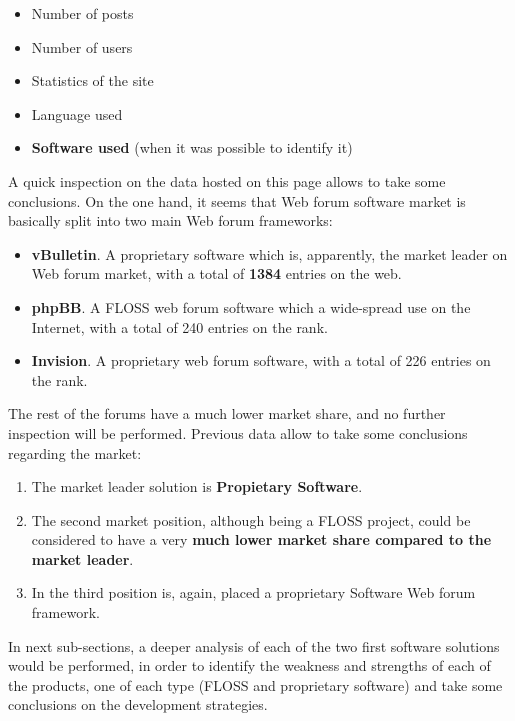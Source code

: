 \documentclass[11pt]{article}
\begin{document}
\begin{itemize}\itemsep0pt
\item{Number of posts}
\item{Number of users}
\item{Statistics of the site}
\item{Language used}
\item{\textbf{Software used} (when it was possible to identify it)}
\end{itemize}
A quick inspection on the data hosted on this page allows to take some conclusions.
On the one hand, it seems that Web forum software market is basically split into two main Web forum frameworks:
\begin{itemize}
\item{\textbf{vBulletin}. A proprietary software which is, apparently, the market leader on Web forum market, with a total of \textbf{1384} entries on the web.}
\item{\textbf{phpBB}. A FLOSS web forum software which a wide-spread use on the Internet, with a total of 240 entries on the rank.}
\item{\textbf{Invision}. A proprietary web forum software, with a total of 226 entries on the rank.}
\end{itemize}
The rest of the forums have a much lower market share, and no further inspection will be performed. Previous data allow to take some conclusions regarding the market:
\begin{enumerate}\itemsep0pt
\item{The market leader solution is \textbf{Propietary Software}.}
\item{The second market position, although being a FLOSS project, could be considered to have a very \textbf{much lower market share compared to the market leader}.}
\item{In the third position is, again, placed a proprietary Software Web forum framework.}
\end{enumerate}
In next sub-sections, a deeper analysis of each of the two first software solutions would be performed, in order to identify the weakness and strengths of each of the products, one of each type (FLOSS and proprietary software) and take some conclusions on the development strategies.
\end{document}
